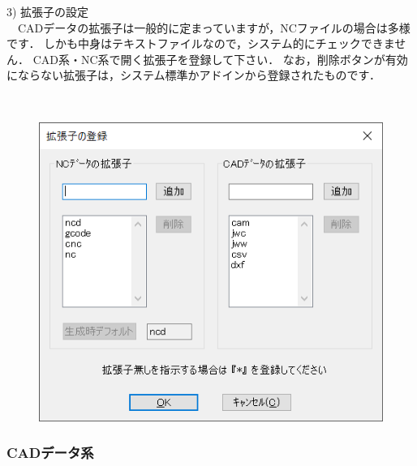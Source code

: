 \begin{minipage}[t]{0.48\textwidth}
3) 拡張子の設定\label{sec:ext}\\
　CADデータの拡張子は一般的に定まっていますが，NCファイルの場合は多様です．
しかも中身はテキストファイルなので，システム的にチェックできません．
CAD系・NC系で開く拡張子を登録して下さい．
なお，削除ボタンが有効にならない拡張子は，システム標準かアドインから登録されたものです．
\end{minipage}
\begin{minipage}[t]{0.02\textwidth}
　
\end{minipage}
\begin{minipage}[t]{0.5\textwidth}
\vspace*{-2zh}
\begin{figure}[H]
\centering
\includegraphics[width=\textwidth]{No6/fig/ext.png}
\label{fig:ext.png}
\end{figure}
\end{minipage}

\subsubsection{CADデータ系}

